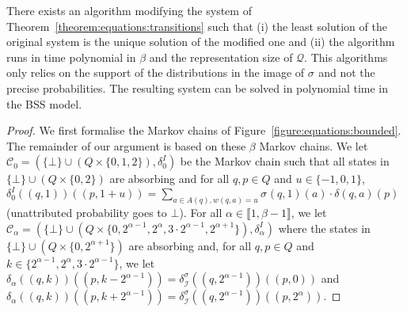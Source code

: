 \documentclass[a4paper,UKenglish,cleveref,autoref,thm-restate,colorlinks]{lipics-v2021}
\newcommand{\integerInterval}[1]{\llbracket{}#1\rrbracket{}}
\newcommand{\mdpTrans}{\delta}
\newcommand{\weight}{w}
\newcommand{\weightVal}{u}
\newcommand{\ocmdp}{\mathcal{Q}}
\newcommand{\ocStateSpace}{Q}
\newcommand{\ocState}{q}
\newcommand{\ocStateB}{p}
\newcommand{\ocCount}{k}
\newcommand{\ocActionSpace}{A}
\newcommand{\ocAction}{a}
\newcommand{\ocTrans}{\delta}
\newcommand{\mchain}{\mathcal{C}}
\newcommand{\intPart}{\mathcal{I}}
\newcommand{\interval}{I}
\newcommand{\powerIndex}{\alpha}
\newcommand{\powerMax}{\beta}
\newcommand{\compressChainTransTemplate}[2]{\mdpTrans^{#1}_{#2}}
\newcommand{\compressChainTrans}{\compressChainTransTemplate{\strat}{\intPart}}
\newcommand{\stratGeneric}[1]{{\sigma_{#1}}}
\newcommand{\strat}{\stratGeneric{}}
\begin{document}
\begin{theorem}\label{theorem:equations:transitions:unique}
    There exists an algorithm modifying the system of Theorem~\ref{theorem:equations:transitions} such that (i) the least solution of the original system is the unique solution of the modified one and (ii) the algorithm runs in time polynomial in $\powerMax$ and the representation size of $\ocmdp$.
  This algorithms only relies on the support of the distributions in the image of $\strat$ and not the precise probabilities.
  The resulting system can be solved in polynomial time in the BSS model.
\end{theorem}
\begin{proof}
  We first formalise the Markov chains of Figure~\ref{figure:equations:bounded}.
  The remainder of our argument is based on these $\powerMax$ Markov chains.
  We let $\mchain_0 = (\{\bot\}\cup(\ocStateSpace\times\{0, 1, 2\}), \mdpTrans_0^\interval)$ be the Markov chain such that all states in $\{\bot\}\cup(\ocStateSpace\times\{0, 2\})$ are absorbing and for all $\ocState,\ocStateB\in\ocStateSpace$ and $\weightVal\in\{-1, 0, 1\}$, $\mdpTrans_0^\interval((\ocState, 1))((\ocStateB, 1+\weightVal)) = \sum_{\ocAction\in\ocActionSpace(\ocState), \weight(\ocState, \ocAction)=\weightVal}\strat(\ocState, 1)(\ocAction)\cdot\ocTrans(\ocState, \ocAction)(\ocStateB)$ (unattributed probability goes to $\bot$).
  For all $\powerIndex\in\integerInterval{1, \powerMax-1}$, we let $\mchain_\powerIndex = (\{\bot\}\cup(\ocStateSpace\times\{0, 2^{\powerIndex-1}, 2^\powerIndex, 3\cdot 2^{\powerIndex-1}, 2^{\powerIndex+1}\}), \mdpTrans_\powerIndex^\interval)$ where the states in $\{\bot\}\cup(\ocStateSpace\times\{0, 2^{\powerIndex+1}\})$ are absorbing and, for all $\ocState, \ocStateB\in\ocStateSpace$ and $\ocCount\in\{2^{\powerIndex-1}, 2^\powerIndex, 3\cdot 2^{\powerIndex-1}\}$, we let $\mdpTrans_\powerIndex((\ocState, \ocCount))((\ocStateB, \ocCount - 2^{\powerIndex-1})) = \compressChainTrans((\ocState, 2^{\powerIndex-1}))((\ocStateB, 0))$ and $\mdpTrans_\powerIndex((\ocState, \ocCount))((\ocStateB, \ocCount + 2^{\powerIndex-1})) = \compressChainTrans((\ocState, 2^{\powerIndex-1}))((\ocStateB, 2^{\powerIndex}))$.


\end{proof}
\end{document}
